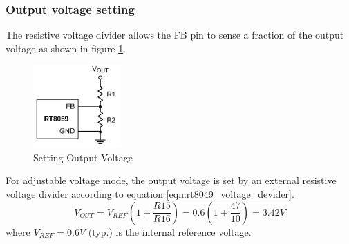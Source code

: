 \documentclass[\main/main.tex]{subfiles}
\begin{document}
\subsubsection{Output voltage setting}
The resistive voltage divider allows the FB pin to sense a fraction of the output voltage as shown in figure \ref{fig:rt8049_setting_output_voltage}.
\begin{figure}[H]
    \begin{center}
        \includegraphics[width=0.3\textwidth]{rt8049_setting_output_voltage.png}
    \end{center}
    \caption{Setting Output Voltage}
    \label{fig:rt8049_setting_output_voltage}
\end{figure}

For adjustable voltage mode, the output voltage is set by an external resistive voltage divider according to equation \ref{eqn:rt8049_voltage_devider}.
\begin{equation}
    V_{OUT} = V_{REF} (1 + \frac{R15}{R16}) = 0.6 (1 + \frac{47}{10}) = 3.42V
    \label{eqn:rt8049_voltage_devider}
\end{equation}
where $V_{REF} = 0.6V$ (typ.) is the internal reference voltage.
\end{document}
